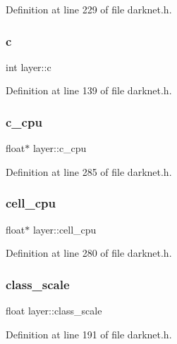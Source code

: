 Definition at line 229 of file darknet.\+h.

\mbox{\label{structlayer_a6d10d2818541049ff11e94b257077a2d}} 
\subsubsection{\texorpdfstring{c}{c}}
{\footnotesize\ttfamily int layer\+::c}



Definition at line 139 of file darknet.\+h.

\mbox{\label{structlayer_ae6b07fa9262cecce9ec149e37c001d81}} 
\subsubsection{\texorpdfstring{c\_cpu}{c\_cpu}}
{\footnotesize\ttfamily float$\ast$ layer\+::c\+\_\+cpu}



Definition at line 285 of file darknet.\+h.

\mbox{\label{structlayer_a0dbcc8d653aaea58b9aaddcda570b9fb}} 
\subsubsection{\texorpdfstring{cell\_cpu}{cell\_cpu}}
{\footnotesize\ttfamily float$\ast$ layer\+::cell\+\_\+cpu}



Definition at line 280 of file darknet.\+h.

\mbox{\label{structlayer_a7175af778d4be5a066ccc212421617b7}} 
\subsubsection{\texorpdfstring{class\_scale}{class\_scale}}
{\footnotesize\ttfamily float layer\+::class\+\_\+scale}



Definition at line 191 of file darknet.\+h.

